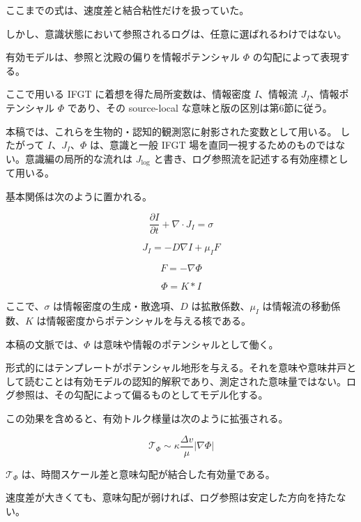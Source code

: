 ここまでの式は、速度差と結合粘性だけを扱っていた。

しかし、意識状態において参照されるログは、任意に選ばれるわけではない。

有効モデルは、参照と沈殿の偏りを情報ポテンシャル $\Phi$ の勾配によって表現する。

ここで用いる IFGT に着想を得た局所変数は、情報密度 $I$、情報流 $J_I$、情報ポテンシャル $\Phi$ であり、その source-local な意味と版の区別は第6節に従う。

本稿では、これらを生物的・認知的観測窓に射影された変数として用いる。
したがって $I$、$J_I$、$\Phi$ は、意識と一般 IFGT 場を直同一視するためのものではない。意識編の局所的な流れは $J_{\log}$ と書き、ログ参照流を記述する有効座標として用いる。

基本関係は次のように置かれる。

\begin{equation}
\frac{\partial I}{\partial t} + \nabla \cdot J_I = \sigma
\end{equation}

\begin{equation}
J_I = -D \nabla I + \mu_I F
\end{equation}

\begin{equation}
F = -\nabla \Phi
\end{equation}

\begin{equation}
\Phi = K * I
\end{equation}

ここで、$\sigma$ は情報密度の生成・散逸項、$D$ は拡散係数、$\mu_I$ は情報流の移動係数、$K$ は情報密度からポテンシャルを与える核である。

本稿の文脈では、$\Phi$ は意味や情報のポテンシャルとして働く。

形式的にはテンプレートがポテンシャル地形を与える。それを意味や意味井戸として読むことは有効モデルの認知的解釈であり、測定された意味量ではない。ログ参照は、その勾配によって偏るものとしてモデル化する。

この効果を含めると、有効トルク様量は次のように拡張される。

\begin{equation}
\mathcal{T}_{\Phi}
\sim
\kappa
\frac{\Delta v}{\mu}
\left|\nabla \Phi\right|
\end{equation}

$\mathcal{T}_{\Phi}$ は、時間スケール差と意味勾配が結合した有効量である。

速度差が大きくても、意味勾配が弱ければ、ログ参照は安定した方向を持たない。

